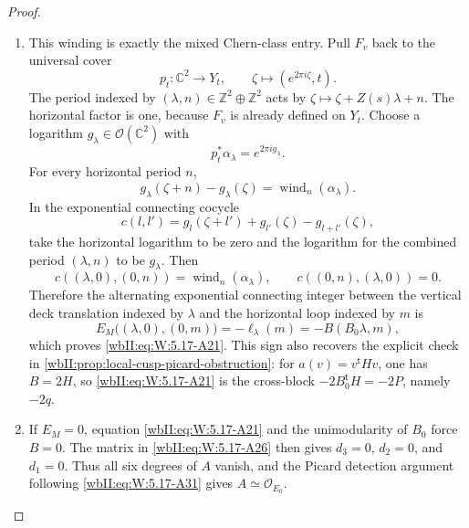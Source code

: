 \begin{proof}
\begin{enumerate}[label=\arabic*.,leftmargin=*]
\item This winding is exactly the mixed Chern-class entry.  Pull \(F_v\) back to
the universal cover
\[
 p_t:\mathbb C^2\longrightarrow Y_t,
 \qquad \zeta\longmapsto(e^{2\pi i\zeta},t).
\]
The period indexed by \((\lambda,n)\in\mathbb Z^2\oplus\mathbb Z^2\)
acts by \(\zeta\mapsto\zeta+Z(s)\lambda+n\).  The horizontal factor is one,
because \(F_v\) is already defined on \(Y_t\).  Choose a logarithm
\(g_\lambda\in\mathcal O(\mathbb C^2)\) with
\[
 p_t^*\alpha_\lambda=e^{2\pi i g_\lambda}.
\]
For every horizontal period \(n\),
\[
 g_\lambda(\zeta+n)-g_\lambda(\zeta)
 =\operatorname{wind}_n(\alpha_\lambda).
\]
In the exponential connecting cocycle
\[
 c(l,l')=g_l(\zeta+l')+g_{l'}(\zeta)-g_{l+l'}(\zeta),
\]
take the horizontal logarithm to be zero and the logarithm for the combined
period \((\lambda,n)\) to be \(g_\lambda\).  Then
\[
 c((\lambda,0),(0,n))
 =\operatorname{wind}_n(\alpha_\lambda),
 \qquad
 c((0,n),(\lambda,0))=0.
\]
Therefore the alternating exponential connecting integer between
the vertical deck
translation indexed by \(\lambda\) and the horizontal loop indexed by
\(m\) is
\[
 E_M\bigl((\lambda,0),(0,m)\bigr)
 =-\ell_\lambda(m)
 =-B(B_0\lambda,m),
\]
which proves \eqref{wbII:eq:W:5.17-A21}.  This sign also recovers the explicit check in
\cref{wbII:prop:local-cusp-picard-obstruction}: for
\(a(v)=v^{\mathsf t}Hv\), one has \(B=2H\), so \eqref{wbII:eq:W:5.17-A21} is the
cross-block \(-2B_0^{\mathsf t}H=-2P\), namely \(-2q\).

\item If \(E_M=0\), equation \eqref{wbII:eq:W:5.17-A21} and the unimodularity of \(B_0\) force
\(B=0\).  The matrix in \eqref{wbII:eq:W:5.17-A26} then gives
\(d_3=0\), \(d_2=0\), and \(d_1=0\).  Thus all six degrees of \(A\)
vanish, and the Picard detection argument following \eqref{wbII:eq:W:5.17-A31} gives
\(A\simeq\mathcal O_{E_0}\).

\end{enumerate}
\end{proof}
